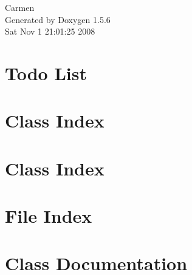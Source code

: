 \documentclass[a4paper]{book}
\begin{document}
\begin{titlepage}
\vspace*{7cm}
\begin{center}
{\Large Carmen }\\
\vspace*{1cm}
{\large Generated by Doxygen 1.5.6}\\
\vspace*{0.5cm}
{\small Sat Nov 1 21:01:25 2008}\\
\end{center}
\end{titlepage}
\clearemptydoublepage
{}
\tableofcontents
\clearemptydoublepage
{}
\chapter{Todo List}
\label{todo}
\hypertarget{todo}{}

\chapter{Class Index}

\chapter{Class Index}

\chapter{File Index}

\chapter{Class Documentation}





















\end{document}
